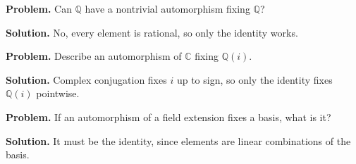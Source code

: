 \begin{example}\label{ex:sec4-8}
\textbf{Problem.} Can $\mathbb{Q}$ have a nontrivial automorphism fixing $\mathbb{Q}$?

\textbf{Solution.} No, every element is rational, so only the identity works.
\end{example}

\begin{example}\label{ex:sec4-9}
\textbf{Problem.} Describe an automorphism of $\mathbb{C}$ fixing $\mathbb{Q}(i)$.

\textbf{Solution.} Complex conjugation fixes $i$ up to sign, so only the identity fixes $\mathbb{Q}(i)$ pointwise.
\end{example}

\begin{example}\label{ex:sec4-10}
\textbf{Problem.} If an automorphism of a field extension fixes a basis, what is it?

\textbf{Solution.} It must be the identity, since elements are linear combinations of the basis.
\end{example}
